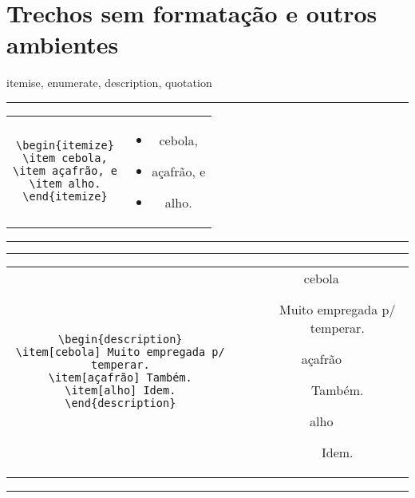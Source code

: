\section{Trechos sem formatação e outros ambientes}


itemise, enumerate, description, quotation

\begin{center}\footnotesize\hrule\smallskip
\begin{tabular}{c|c}
\begin{minipage}{.465\textwidth}
\begin{verbatim}
\begin{itemize}
\item cebola,
\item açafrão, e
\item alho.
\end{itemize}
\end{verbatim}
\end{minipage} &
\begin{minipage}{.465\textwidth}
\begin{itemize}
\item cebola,
\item açafrão, e
\item alho.
\end{itemize}
\end{minipage}
\end{tabular}
\smallskip\hrule
\end{center}


\begin{center}\footnotesize\hrule\smallskip
\begin{tabular}{c|c}
\begin{minipage}{.465\textwidth}
\begin{verbatim}
\begin{description}
\item[cebola] Muito empregada p/ temperar.
\item[açafrão] Também.
\item[alho] Idem.
\end{description}
\end{verbatim}
\end{minipage} &
\begin{minipage}{.465\textwidth}
\begin{description}
\item[cebola] Muito empregada p/ temperar.
\item[açafrão] Também.
\item[alho] Idem.
\end{description}
\end{minipage}
\end{tabular}
\smallskip\hrule
\end{center}

